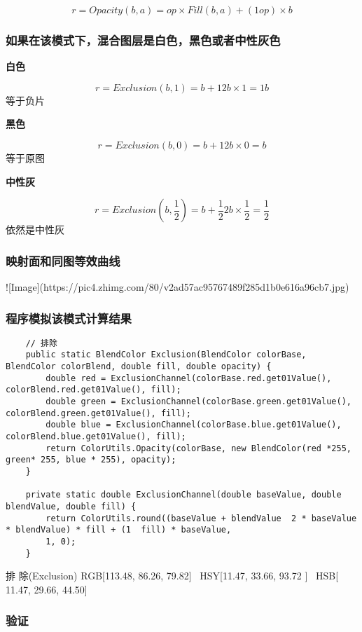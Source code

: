 $$r=Opacity(b,a)=op\times Fill(b,a)+(1op)\times b$$

\subsubsection{ 如果在该模式下，混合图层是白色，黑色或者中性灰色}

\textbf{ 白色}

$$r=Exclusion(b,1)=b+12b\times 1=1b$$
等于负片

\textbf{ 黑色}

$$r=Exclusion(b,0)=b+12b\times 0=b$$
等于原图

\textbf{ 中性灰}

$$r=Exclusion(b,\dfrac{1}{2})=b+\dfrac{1}{2}2b\times \dfrac{1}{2}=\dfrac{1}{2}$$
依然是中性灰

\subsubsection{ 映射面和同图等效曲线}

![Image](https://pic4.zhimg.com/80/v2ad57ac95767489f285d1b0e616a96cb7.jpg)

\subsubsection{ 程序模拟该模式计算结果}

\begin{lstlisting}
	// 排除
	public static BlendColor Exclusion(BlendColor colorBase, BlendColor colorBlend, double fill, double opacity) {
		double red = ExclusionChannel(colorBase.red.get01Value(), colorBlend.red.get01Value(), fill);
		double green = ExclusionChannel(colorBase.green.get01Value(), colorBlend.green.get01Value(), fill);
		double blue = ExclusionChannel(colorBase.blue.get01Value(), colorBlend.blue.get01Value(), fill);
		return ColorUtils.Opacity(colorBase, new BlendColor(red *255, green* 255, blue * 255), opacity);
	}
	
	private static double ExclusionChannel(double baseValue, double blendValue, double fill) {
		return ColorUtils.round((baseValue + blendValue  2 * baseValue * blendValue) * fill + (1  fill) * baseValue,
		1, 0);
	}
\end{lstlisting}



排    除(Exclusion)     RGB[113.48,  86.26,  79.82]~ HSY[11.47,  33.66,  93.72 ]~ HSB[ 11.47,  29.66,  44.50]


\subsubsection{ 验证}

